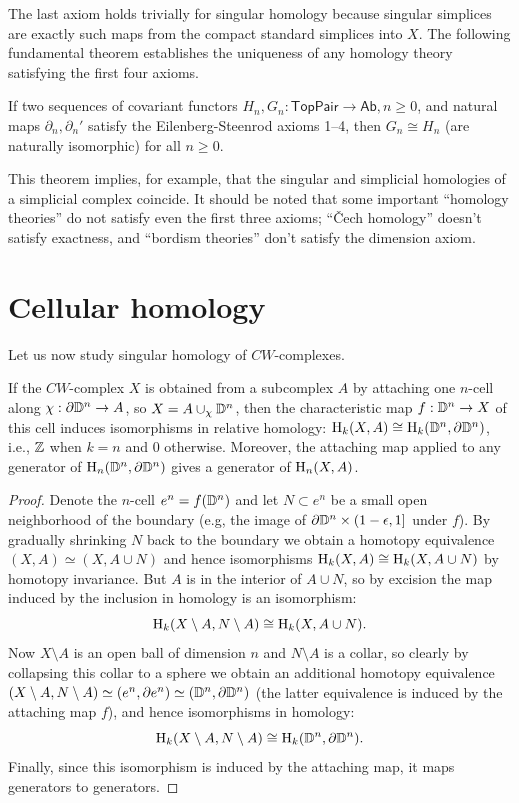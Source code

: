 The last axiom holds trivially for singular homology because singular simplices are exactly such maps from the compact standard simplices into $X$. The following fundamental theorem establishes the uniqueness of any homology theory satisfying the first four axioms.


\begin{thm}
    If two sequences of covariant functors $H_n,G_n:\mathsf{TopPair}\to \mathsf{Ab}, n\geq 0$, and natural maps $\partial_n,\partial_n '$ satisfy the Eilenberg-Steenrod axioms 1--4, then $G_n\cong H_n$ (are naturally isomorphic) for all $n\geq 0$.
\end{thm}

 This theorem implies, for example, that the singular and simplicial homologies of a simplicial complex coincide. It should be noted that some important ``homology theories'' do not satisfy even the first three axioms; ``\v Cech homology'' doesn't satisfy exactness, and ``bordism theories'' don't satisfy the dimension axiom.


\section{Cellular homology}

Let us now study singular homology of $CW$-complexes.


\begin{prop}\label{lem 39.1 munkres}
    If the $CW$-complex $X$ is obtained from a subcomplex $A$ by attaching one $n$-cell along $\chi:\partial \mathbb{D}^n\to A$, so $X=A\cup_\chi \mathbb{D}^n$, then the characteristic map $f:\mathbb{D}^n\to X$ of this cell induces isomorphisms in relative homology: $\mathrm{H}_k(X,A)\cong \mathrm{H}_k(\mathbb{D}^n,\partial \mathbb{D}^n)$, i.e., $\mathbb{Z}$ when $k=n$ and $0$ otherwise. Moreover, the attaching map applied to any generator of $\mathrm{H}_n(\mathbb{D}^n,\partial \mathbb{D}^n)$ gives a generator of $\mathrm{H}_n(X,A)$.
\end{prop}
\begin{proof}
    Denote the $n$-cell $e^n=f(\mathbb{D}^n)$ and let $N\subset e^n$ be a small open neighborhood of the boundary (e.g, the image of $\partial \mathbb{D}^n\times (1-\epsilon,1]$ under $f$). By gradually shrinking $N$ back to the boundary we obtain a homotopy equivalence $(X,A)\simeq (X,A\cup N)$ and hence isomorphisms $\mathrm{H}_k(X,A)\cong \mathrm{H}_k(X,A\cup N)$ by homotopy invariance. But $A$ is in the interior of $A\cup N$, so by excision the map induced by the inclusion in homology is an isomorphism:
    \[\mathrm{H}_k(X\setminus A,N\setminus A)\cong \mathrm{H}_k(X,A\cup N).\]
    Now $X\setminus A$ is an open ball of dimension $n$ and $N\setminus A$ is a collar, so clearly by collapsing this collar to a sphere we obtain an additional homotopy equivalence $(X\setminus A,N\setminus A)\simeq (e^n,\partial e^n)\simeq (\mathbb{D}^n,\partial \mathbb{D}^n)$ (the latter equivalence is induced by the attaching map $f$), and hence isomorphisms in homology:
    \[\mathrm{H}_k(X\setminus A,N\setminus A)\cong \mathrm{H}_k(\mathbb{D}^n,\partial \mathbb{D}^n).\]
    Finally, since this isomorphism is induced by the attaching map, it maps generators to generators.
\end{proof}

